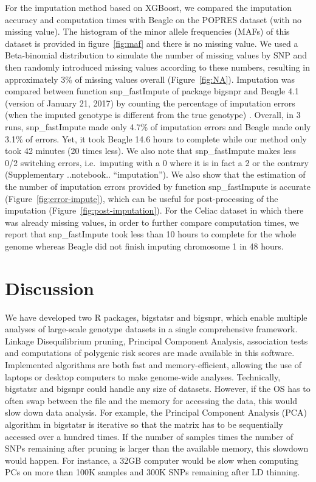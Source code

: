 \documentclass{bioinfo}
\begin{document}
For the imputation method based on XGBoost, we compared  the imputation accuracy and computation times with Beagle on the POPRES dataset (with no missing value). 
The histogram of the minor allele frequencies (MAFs) of this dataset is provided in figure~\ref{fig:maf} and there is no missing value. 
We used a Beta-binomial distribution to simulate the number of missing values by SNP and then randomly introduced missing values according to these numbers, resulting in approximately 3\% of missing values overall (Figure~\ref{fig:NA}).
Imputation was compared between function snp\_fastImpute of package bigsnpr and Beagle 4.1 (version of January 21, 2017) 
{\color{red}
by counting the percentage of imputation errors (when the imputed genotype is different from the true genotype)
}.
Overall, in 3 runs, snp\_fastImpute made only 4.7\% of imputation errors and Beagle made only 3.1\% of errors. Yet, it took Beagle 14.6 hours to complete while our method only took 42 minutes (20 times less). 
{\color{red}
We also note that snp\_fastImpute makes less 0/2 switching errors, i.e.\ imputing with a 0 where it is in fact a 2 or the contrary (Supplementary ..notebook.. ``imputation'').
We also show that the estimation of the number of imputation errors provided by function snp\_fastImpute is accurate (Figure~\ref{fig:error-impute}), which can be useful for post-processing of the imputation (Figure~\ref{fig:post-imputation}).
}
For the Celiac dataset in which there was already missing values, in order to further compare computation times, we report that snp\_fastImpute took less than 10 hours to complete for the whole genome whereas Beagle did not finish imputing chromosome 1 in 48 hours. 



\section{Discussion}

We have developed two R packages, bigstatsr and bigsnpr, which enable multiple analyses of large-scale genotype datasets in a single comprehensive framework. Linkage Disequilibrium pruning, Principal Component Analysis, association tests and computations of polygenic risk scores are made available in this software. Implemented algorithms are both fast and memory-efficient, allowing the use of laptops or desktop computers to make genome-wide analyses. 
Technically, bigstatsr and bigsnpr could handle any size of datasets. However, if the OS has to often swap between the file and the memory for accessing the data, this would slow down data analysis. For example, the Principal Component Analysis (PCA) algorithm in bigstatsr is iterative so that the matrix has to be sequentially accessed over a hundred times. If the number of samples times the number of SNPs remaining after pruning is larger than the available memory, this slowdown would happen. For instance, a 32GB computer would be slow when computing PCs on more than 100K samples and 300K SNPs remaining after LD thinning.
\end{document}

